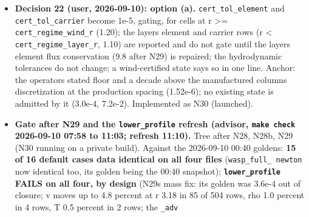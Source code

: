 \documentclass[english,a4paper]{my_memo}
\begin{document}
\begin{itemize}
  remap control 1.5e-5, Richardson limit 1.31e-4: \textbf{78 percent of the row is
  discretization}; element flux spread in the layer \textbf{39.3 -\textgreater{} 9.79} (He),
  37.3 -\textgreater{} 9.09 (H), the wind 2.6e-2 -\textgreater{} 2.7e-2, the escape window 2.0e-3.
  Memo: sections 3 (mass closure) and 6 (the reload) marked CLOSED by N29
  with the readings; section 5 rewritten; section 7\textquotesingle s proposal re-stated
  with the new floors and \textbf{option (a) supported as written} (1e-5 gating at
  r \textgreater= \texttt{cert\_regime\_wind\_r}, the layer reported and not gating); two of its
  three prerequisites discharged, the layer\textquotesingle s flux conservation (9.8)
  standing. No proposal certifies either candidate (wind element row 3.05e-4
  and 7.2e-2 against a proposed 1e-5). \texttt{certification} 42/0. Reported: the
  iron wind row of the atomic candidate rose 18x between the two chaotic
  states (a size, not a trend); the derivative anchor is not measured at the
  loaded state itself (needs the probe under \texttt{stationary\ evaluate},
  \texttt{steady\_newton.f90}).
\item
  \textbf{Decision 22 (user, 2026-09-10): option (a).} \texttt{cert\_tol\_element} and
  \texttt{cert\_tol\_carrier} become 1e-5, gating, for cells at r \textgreater= \texttt{cert\_regime\_wind\_r}
  (1.20); the layer\textquotesingle s element and carrier rows (r \textless{} \texttt{cert\_regime\_layer\_r},
  1.10) are reported and do not gate until the layer\textquotesingle s element flux
  conservation (9.8 after N29) is repaired; the hydrodynamic tolerances do
  not change; a wind-certified state says so in one line. Anchor: the
  operator\textquotesingle s stated floor and a decade above the manufactured column\textquotesingle s
  discretization at the production spacing (1.52e-6); no existing state is
  admitted by it (3.0e-4, 7.2e-2). Implemented as N30 (launched).
\item
  \textbf{Gate after N29 and the \texttt{lower\_profile} refresh (advisor, \texttt{make\ check}
  2026-09-10 07:58 to 11:03; refresh 11:10).} Tree after N28, N28b, N29
  (N30 running on a private build). Against the 2026-09-10 00:40 goldens:
  \textbf{15 of 16 default cases data identical on all four files} (\texttt{wasp\_full\_\ newton} now identical too, its golden being the 00:40 snapshot);
  \textbf{\texttt{lower\_profile} FAILS on all four, by design} (N29\textquotesingle s mass fix: its
  golden was 3.6e-4 out of closure; v moves up to 4.8 percent at r 3.18 in 85
  of 504 rows, rho 1.0 percent in 4 rows, T 0.5 percent in 2 rows; the \texttt{\_adv}

\end{itemize}
\end{document}
